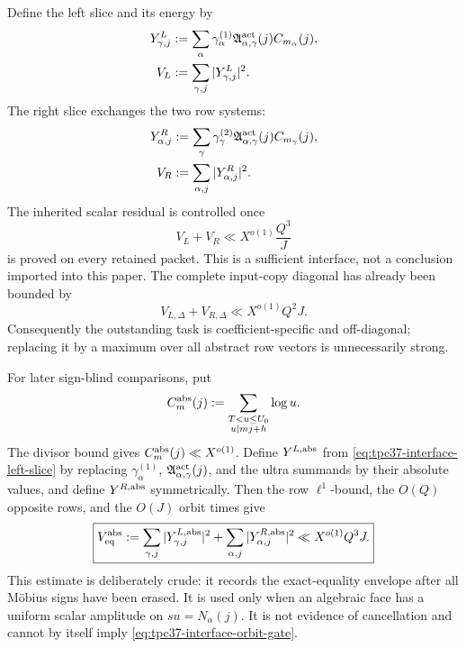 Define the left slice and its energy by
\begin{align}
 Y_{\gamma,j}^L
 &:=\sum_\alpha \gamma_\alpha^{(1)}
 \mathfrak A_{\alpha,\gamma}^{\rm act}(j)C_{m_\alpha}(j),
 \label{eq:tpc37-interface-left-slice}\\
 V_L&:=\sum_{\gamma,j}|Y_{\gamma,j}^L|^2.
 \label{eq:tpc37-interface-left-energy}
\end{align}
The right slice exchanges the two row systems:
\begin{align}
 Y_{\alpha,j}^R
 &:=\sum_\gamma \gamma_\gamma^{(2)}
 \mathfrak A_{\alpha,\gamma}^{\rm act}(j)C_{m_\gamma}(j),
 \label{eq:tpc37-interface-right-slice}\\
 V_R&:=\sum_{\alpha,j}|Y_{\alpha,j}^R|^2.
 \label{eq:tpc37-interface-right-energy}
\end{align}
The inherited scalar residual is controlled once
\begin{equation}
 V_L+V_R\ll X^{o(1)}\frac{Q^3}{J}
 \label{eq:tpc37-interface-orbit-gate}
\end{equation}
is proved on every retained packet.  This is a sufficient interface, not
a conclusion imported into this paper.  The complete input-copy diagonal
has already been bounded by
\begin{equation}
 V_{L,\Delta}+V_{R,\Delta}
 \ll X^{o(1)}Q^2J.
 \label{eq:tpc37-interface-diagonal}
\end{equation}
Consequently the outstanding task is coefficient-specific and
off-diagonal; replacing it by a maximum over all abstract row vectors is
unnecessarily strong.

For later sign-blind comparisons, put
\begin{equation}
 C_m^{\rm abs}(j)
 :=\sum_{\substack{T<u\le U_0\\u\mid mj+h}}\log u.
 \label{eq:tpc37-interface-absolute-increment}
\end{equation}
The divisor bound gives $C_m^{\rm abs}(j)\ll X^{o(1)}$.  Define
$Y^{L,\rm abs}$ from \eqref{eq:tpc37-interface-left-slice} by replacing
$\gamma_\alpha^{(1)}$,
$\mathfrak A_{\alpha,\gamma}^{\rm act}(j)$, and the ultra summands by
their absolute values, and define $Y^{R,\rm abs}$ symmetrically.  Then
the row $\ell^1$-bound, the $O(Q)$ opposite rows, and the $O(J)$
orbit times give
\begin{equation}
 \boxed{
 V_{\rm eq}^{\rm abs}
 :=\sum_{\gamma,j}|Y_{\gamma,j}^{L,\rm abs}|^2
  +\sum_{\alpha,j}|Y_{\alpha,j}^{R,\rm abs}|^2
 \ll X^{o(1)}Q^3J.}
 \label{eq:tpc37-interface-absolute-baseline}
\end{equation}
This estimate is deliberately crude: it records the exact-equality
envelope after all M\"obius signs have been erased.  It is used only when
an algebraic face has a uniform scalar amplitude on $su=N_\alpha(j)$.
It is not evidence of cancellation and cannot by itself imply
\eqref{eq:tpc37-interface-orbit-gate}.

